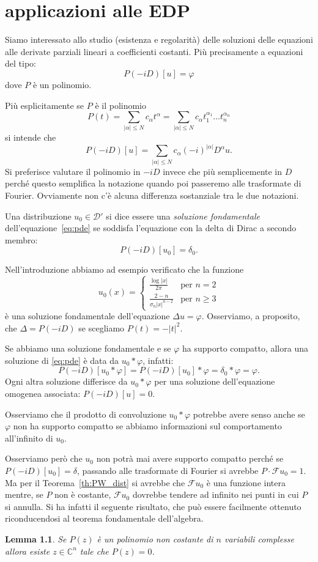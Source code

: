 \documentclass[italian,a4paper,oneside,headinclude]{scrbook}
\renewcommand{\phi}{\varphi}
\newcommand{\D}{\mathcal D}
\newcommand{\F}{\mathcal F}
\newcommand{\CC}{\mathbb C}
\newcommand{\abs}[1]{{\left|#1\right|}}
\newtheorem{lemma}[theorem]{Lemma}
\begin{document}
\chapter{applicazioni alle EDP}

Siamo interessato allo studio (esistenza e regolarità) delle soluzioni
delle equazioni alle derivate parziali lineari a coefficienti
costanti. Più precisamente a equazioni del tipo:
\begin{equation}\label{eq:pde}
P(-iD) [u] = \phi
\end{equation}
dove $P$ è un polinomio.

Più esplicitamente se $P$ è il polinomio
\[
P(t) = \sum_{\abs{\alpha}\le N} c_\alpha t^\alpha
= \sum_{\abs{\alpha}\le N} c_\alpha t_1^{\alpha_1}\dots t_n^{\alpha_n}
\]
si intende che
\[
P(-iD) [u] = \sum_{\abs{\alpha}\le N} c_\alpha (-i)^{\abs{\alpha}}
D^\alpha u.
\]
Si preferisce valutare il polinomio in $-iD$ invece che più
semplicemente in $D$ perché questo semplifica la notazione quando poi
passeremo alle trasformate di Fourier. Ovviamente non c'è alcuna
differenza sostanziale tra le due notazioni.

Una distribuzione $u_0\in \D'$ si dice essere una \emph{soluzione
  fondamentale}
 dell'equazione~\eqref{eq:pde} se
soddisfa l'equazione con la delta di Dirac a secondo membro:
\[
P(-iD) [u_0] = \delta_0.
\]

Nell'introduzione abbiamo ad esempio verificato che la funzione
\[
u_0(x) =
\begin{cases}
  \frac{\log \abs{x}}{2\pi} & \text{per $n=2$}\\
  \frac{2-n}{\sigma_n \abs{x}^{n-2}} & \text{per $n\geq 3$}
\end{cases}
\]
è una soluzione fondamentale dell'equazione $\Delta u = \phi$.
Osserviamo, a proposito, che $\Delta = P(-iD)$ se scegliamo $P(t)=-\abs{t}^2$.

Se abbiamo una soluzione fondamentale e se $\phi$ ha supporto
compatto,
allora una soluzione
di \eqref{eq:pde} è data da $u_0 * \phi$, infatti:
\[
P(-iD) [u_0 * \phi] = P(-iD) [u_0] * \phi = \delta_0 * \phi = \phi.
\]
Ogni altra soluzione differisce da $u_0 * \phi$ per una soluzione
dell'equazione omogenea associata: $P(-iD)[u] = 0$.

Osserviamo che il prodotto di convoluzione $u_0 * \phi$ potrebbe avere
senso anche se $\phi$ non ha supporto compatto se abbiamo informazioni
sul comportamento all'infinito di $u_0$.

Osserviamo però che
$u_0$ non potrà mai avere supporto
compatto perché se $P(-iD)[u_0]= \delta$, passando alle trasformate di
Fourier si avrebbe $P\cdot \F u_0 = 1$.
Ma per il Teorema~\ref{th:PW_dist} si avrebbe che $\F u_0$ è una
funzione intera mentre, se $P$ non è costante,
$\F u_0$ dovrebbe tendere ad infinito nei punti
in cui $P$ si annulla. Si ha infatti il seguente risultato, che può
essere facilmente ottenuto riconducendosi al teorema fondamentale
dell'algebra.
\begin{lemma}
  Se $P(z)$ è un polinomio non costante
  di $n$ variabili complesse allora esiste $z\in \CC^n$ tale che $P(z)=0$.
\end{lemma}
\end{document}
